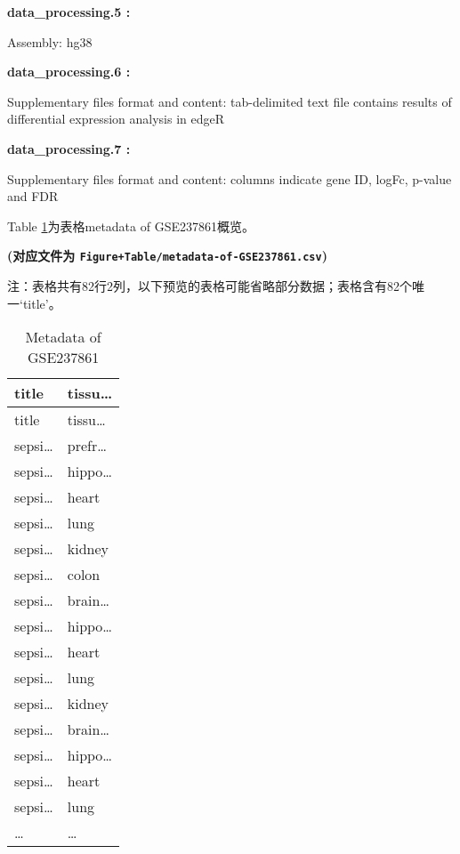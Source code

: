 \documentclass[
]{article}
\begin{document}
\begin{center}
\begin{tcolorbox}[colback=gray!10, colframe=gray!50, width=0.9\linewidth, arc=1mm, boxrule=0.5pt]
\vspace{2em}


\textbf{
data\_processing.5
:}

\vspace{0.5em}

    Assembly: hg38

\vspace{2em}


\textbf{
data\_processing.6
:}

\vspace{0.5em}

    Supplementary files format and content: tab-delimited
text file contains results of differential expression
analysis in edgeR

\vspace{2em}


\textbf{
data\_processing.7
:}

\vspace{0.5em}

    Supplementary files format and content: columns
indicate gene ID, logFc, p-value and FDR

\vspace{2em}
\end{tcolorbox}
\end{center}

Table \ref{tab:metadata-of-GSE237861}为表格metadata of GSE237861概览。

\textbf{(对应文件为 \texttt{Figure+Table/metadata-of-GSE237861.csv})}

\begin{center}\begin{tcolorbox}[colback=gray!10, colframe=gray!50, width=0.9\linewidth, arc=1mm, boxrule=0.5pt]注：表格共有82行2列，以下预览的表格可能省略部分数据；表格含有82个唯一`title'。
\end{tcolorbox}
\end{center}

\begin{longtable}[]{@{}ll@{}}
\caption{\label{tab:metadata-of-GSE237861}Metadata of GSE237861}\tabularnewline
\toprule
title & tissu\ldots{}\tabularnewline
\midrule
\endfirsthead
\toprule
title & tissu\ldots{}\tabularnewline
\midrule
\endhead
sepsi\ldots{} & prefr\ldots{}\tabularnewline
sepsi\ldots{} & hippo\ldots{}\tabularnewline
sepsi\ldots{} & heart\tabularnewline
sepsi\ldots{} & lung\tabularnewline
sepsi\ldots{} & kidney\tabularnewline
sepsi\ldots{} & colon\tabularnewline
sepsi\ldots{} & brain\ldots{}\tabularnewline
sepsi\ldots{} & hippo\ldots{}\tabularnewline
sepsi\ldots{} & heart\tabularnewline
sepsi\ldots{} & lung\tabularnewline
sepsi\ldots{} & kidney\tabularnewline
sepsi\ldots{} & brain\ldots{}\tabularnewline
sepsi\ldots{} & hippo\ldots{}\tabularnewline
sepsi\ldots{} & heart\tabularnewline
sepsi\ldots{} & lung\tabularnewline
\ldots{} & \ldots{}\tabularnewline
\bottomrule
\end{longtable}
\end{document}
